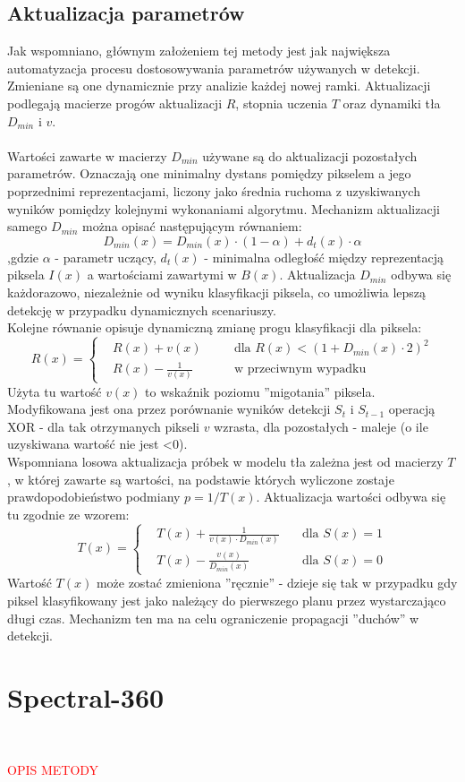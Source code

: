 \subsection{Aktualizacja parametrów}
Jak wspomniano, głównym założeniem tej metody jest jak największa automatyzacja procesu dostosowywania parametrów używanych w detekcji. Zmieniane są one dynamicznie przy analizie każdej nowej ramki. Aktualizacji podlegają macierze progów aktualizacji $R$, stopnia uczenia $T$ oraz dynamiki tła $D_{min}$ i $v$.
\paragraph{}
Wartości zawarte w macierzy $D_{min}$ używane są do aktualizacji pozostałych parametrów. Oznaczają one minimalny dystans pomiędzy pikselem a jego poprzednimi reprezentacjami, liczony jako średnia ruchoma z uzyskiwanych wyników pomiędzy kolejnymi wykonaniami algorytmu. Mechanizm aktualizacji samego $D_{min}$ można opisać następującym równaniem:
\begin{equation}
D_{min}(x) = D_{min}(x)\cdot (1-\alpha)+d_{t}(x)\cdot \alpha
\end{equation}
,gdzie $\alpha$ - parametr uczący, $d_{t}(x)$ - minimalna odległość między reprezentacją piksela $I(x)$ a wartościami zawartymi w $B(x)$. Aktualizacja $D_{min}$ odbywa się każdorazowo, niezależnie od wyniku klasyfikacji piksela, co umożliwia lepszą detekcję w przypadku dynamicznych scenariuszy.\\
Kolejne równanie opisuje dynamiczną zmianę progu klasyfikacji dla piksela:
\begin{equation}
R(x) = \left\{
\begin{split}
&R(x) + v(x) & \quad &\text{dla $R(x)<(1+D_{min}(x)\cdot 2)^2$} \\
&R(x) - \frac{1}{v(x)} & \quad &\text{w przeciwnym wypadku}
\end{split}
\right.
\end{equation}
Użyta tu wartość $v(x)$ to wskaźnik poziomu ''migotania'' piksela. Modyfikowana jest ona przez porównanie wyników detekcji $S_{t}$ i $S_{t-1}$ operacją XOR - dla tak otrzymanych pikseli $v$ wzrasta, dla pozostałych - maleje (o ile uzyskiwana wartość nie jest <0). \\
Wspomniana losowa aktualizacja próbek w modelu tła zależna jest od macierzy $T$, w której zawarte są wartości, na podstawie których wyliczone zostaje prawdopodobieństwo podmiany $p = 1/T(x)$. Aktualizacja wartości odbywa się tu zgodnie ze wzorem:
\begin{equation}
T(x) = \left\{
\begin{split}
&T(x) + \frac{1}{v(x)\cdot D_{min}(x)} & \quad \text{dla $S(x)=1$} \\
&T(x) - \frac{v(x)}{D_{min}(x)} & \quad \text{dla $S(x)=0$}
\end{split}
\right.
\end{equation}
Wartość $T(x)$ może zostać zmieniona ''ręcznie'' - dzieje się tak w przypadku gdy piksel klasyfikowany jest jako należący do pierwszego planu przez wystarczająco długi czas. Mechanizm ten ma na celu ograniczenie propagacji ''duchów'' w detekcji.
\section{Spectral-360}
\cite{6910013}\\
\begin{LARGE}
\textcolor{red}{OPIS METODY}
\end{LARGE}


